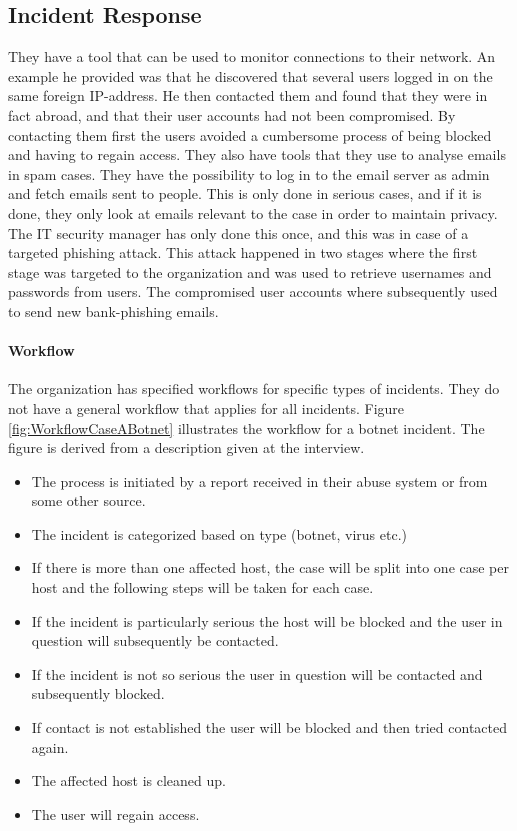 \subsection{Incident Response}
They have a tool that can be used to monitor connections to their network. An example he provided was that he discovered that several users logged in on the same foreign IP-address. He then contacted them and found that they were in fact abroad, and that their user accounts had not been compromised. By contacting them first the users avoided a cumbersome process of being blocked and having to regain access. They also have tools that they use to analyse emails in spam cases. They have the possibility to log in to the email server as admin and fetch emails sent to people. This is only done in serious cases, and if it is done, they only look at emails relevant to the case in order to maintain privacy. The IT security manager has only done this once, and this was in case of a targeted phishing attack. This attack happened in two stages where the first stage was targeted to the organization and was used to retrieve usernames and passwords from users. The compromised user accounts where subsequently used to send new bank-phishing emails.

\paragraph{Workflow}
The organization has specified workflows for specific types of incidents. They do not have a general workflow that applies for all incidents. Figure \ref{fig:WorkflowCaseABotnet} illustrates the workflow for a botnet incident. The figure is derived from a description given at the interview. 

\begin{itemize}\itemsep-0.2cm
\item The process is initiated by a report received in their abuse system or from some other source. 
\item The incident is categorized based on type (botnet, virus etc.)
\item If there is more than one affected host, the case will be split into one case per host and the following steps will be taken for each case.
\item If the incident is particularly serious the host will be blocked and the user in question will subsequently be contacted.
\item If the incident is not so serious the user in question will be contacted and subsequently blocked.
\item If contact is not established the user will be blocked and then tried contacted again.
\item The affected host is cleaned up.
\item The user will regain access.
\end{itemize}


